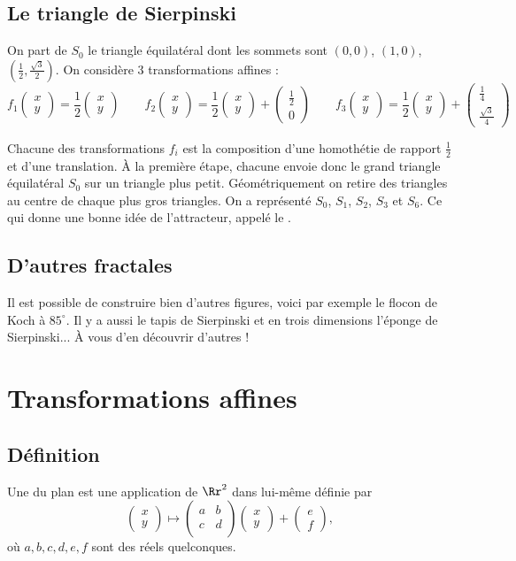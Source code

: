 \documentclass[11pt,class=report,crop=false]{standalone}
\newcommand{\myvec}[2]{\begin{pmatrix}#1 \\ #2\end{pmatrix}}
\newcommand{\commentfigure}[1]{#1} %
\begin{document}
\subsection{Le triangle de Sierpinski}

On part de $S_0$ le triangle équilatéral dont les sommets sont $(0,0)$,
$(1,0)$, $(\frac12,\frac{\sqrt3}{2})$. On considère $3$ transformations affines :
$$f_1 \myvec{x}{y} = \frac12 \myvec{x}{y} \qquad
f_2\myvec{x}{y} = \frac12 \myvec{x}{y}+ \myvec{\frac12}{0} \qquad
f_3\myvec{x}{y} = \frac12 \myvec{x}{y}+ \myvec{\frac14}{\frac{\sqrt3}{4}}
$$

Chacune des transformations $f_i$ est la composition d'une homothétie de rapport $\frac12$ et d'une translation.
\`A la première étape, chacune envoie donc le grand triangle équilatéral $S_0$ sur un triangle plus petit.
Géométriquement on retire des triangles au centre de chaque plus gros triangles.
On a représenté $S_0$, $S_1$, $S_2$, $S_3$ et $S_6$. Ce qui donne une bonne idée
de l'attracteur, appelé le .

\commentfigure{
}


\subsection{D'autres fractales}

Il est possible de construire bien d'autres figures, voici par exemple le flocon de Koch à $85^\circ$. Il y a aussi le tapis de Sierpinski et en trois dimensions l'éponge de Sierpinski... \`A vous d'en découvrir d'autres !
\commentfigure{
}




\section{Transformations affines}

\subsection{Définition}

Une  du plan est une application
de $\Rr^2$ dans lui-même définie 
par
$$\myvec{x}{y} \mapsto \begin{pmatrix}a & b \\ c & d \\  \end{pmatrix}
\myvec{x}{y} + \myvec{e}{f},$$
où $a,b,c,d, e, f$ sont des réels quelconques.
\end{document}
